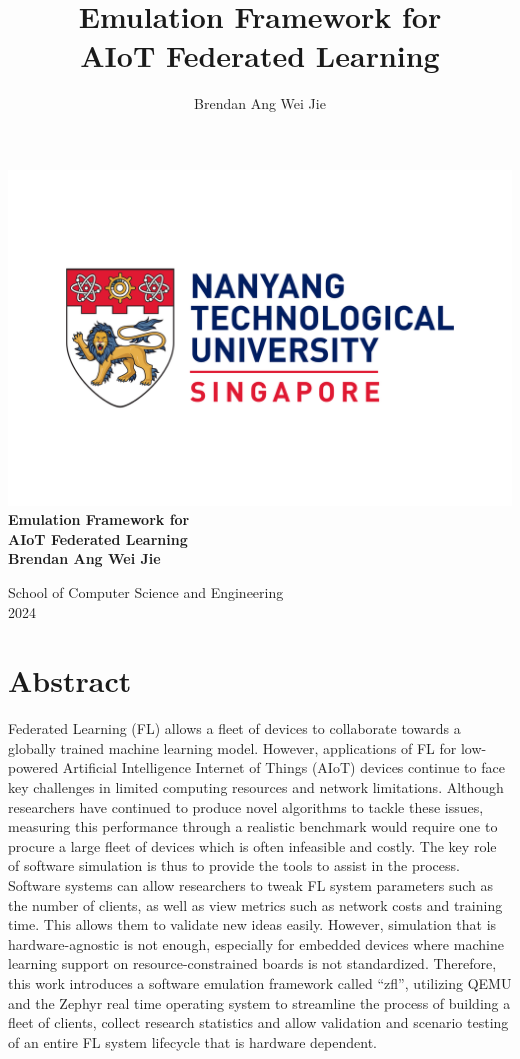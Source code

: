 \documentclass[12pt]{article}
\title{Emulation Framework for\protect\\ AIoT Federated Learning}
\author{Brendan Ang Wei Jie}
\begin{document}
\begin{titlepage}
  \begin{center}
    \includegraphics[width=\linewidth]{ntu} %
    \vfill
    {\bfseries\Large
        Emulation Framework for\protect\\ AIoT Federated Learning\\
        \vskip2cm
        Brendan Ang Wei Jie\\
    }
  \end{center}
    \vfill
    \vfill
    School of Computer Science and Engineering\\
    2024
    \vfill
\end{titlepage}

\pagebreak
\section{Abstract}
Federated Learning (FL) allows a fleet of devices to collaborate towards a globally trained machine
learning model. However, applications of FL for low-powered Artificial Intelligence Internet of Things (AIoT)
devices continue to face key challenges in limited computing resources and network limitations. Although
researchers have continued to produce novel algorithms to tackle these issues, measuring this performance through a realistic benchmark would require
one to procure a large fleet of devices which is often infeasible and costly. The key role
of software simulation is thus to provide the tools to assist in the process. Software systems can allow
researchers to tweak FL system parameters such as the number of clients, as well as view metrics such
as network costs and training time. This allows them to validate new ideas easily. However,
simulation that is hardware-agnostic is not enough, especially for embedded devices where machine
learning support on resource-constrained boards is not standardized. Therefore, this work introduces a software emulation framework
called ``zfl'', utilizing QEMU and the Zephyr real time operating system to streamline the process
of building a fleet of clients, collect research statistics and allow validation and
scenario testing of an entire FL system lifecycle that is hardware dependent.
\end{document}
